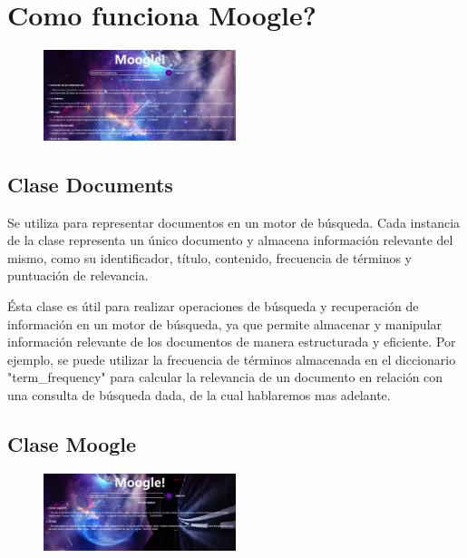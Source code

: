 \documentclass{article}
\begin{document}
\section{Como funciona Moogle?}

\begin{figure}[h!]
\centering
\includegraphics[width=0.5\textwidth]{../Informe/photos/img_4.png}
\end{figure}

\subsection{Clase Documents}

Se utiliza para representar documentos en un motor de búsqueda. Cada instancia de la clase representa un único documento y almacena información relevante del mismo, como su identificador, título, contenido, frecuencia de términos y puntuación de relevancia.

Ésta clase es útil para realizar operaciones de búsqueda y recuperación de información en un motor de búsqueda, ya que permite almacenar y manipular información relevante de los documentos de manera estructurada y eficiente. Por ejemplo, se puede utilizar la frecuencia de términos almacenada en el diccionario "term\_frequency" para calcular la relevancia de un documento en relación con una consulta de búsqueda dada, de la cual hablaremos mas adelante.

\subsection{Clase Moogle}

\begin{figure}[h!]
\centering
\includegraphics[width=0.5\textwidth]{../Informe/photos/img_7.png}
\end{figure}
\end{document}
